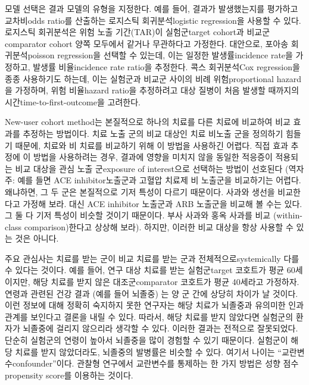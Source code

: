 \documentclass[10.5pt]{book}
\theoremstyle{definition}
\theoremstyle{definition}
\theoremstyle{definition}
\theoremstyle{remark}
\let\BeginKnitrBlock\begin \let\EndKnitrBlock\end
\begin{document}
모델 선택은 결과 모델의 유형을 지정한다. 예를 들어, 결과가 발생했는지를
평가하고 교차비odds ratio를 산출하는 로지스틱 회귀분석logistic
regression을 사용할 수 있다. 로지스틱 회귀분석은 위험 노출 기간(TAR)이
실험군target cohort과 비교군comparator cohort 양쪽 모두에서 같거나
무관하다고 가정한다. 대안으로, 포아송 회귀분석poisson regression을
선택할 수 있는데, 이는 일정한 발생률incidence rate을 가정하고, 발생률
비율incidence rate ratio을 추정한다. 콕스 회귀분석Cox regression을 종종
사용하기도 하는데, 이는 실험군과 비교군 사이의 비례 위험proportional
hazard을 가정하며, 위험 비율hazard ratio을 추정하려고 대상 질병이 처음
발생할 때까지의 시간time-to-first-outcome을 고려한다.
 

\BeginKnitrBlock{rmdimportant}
New-user cohort method는 본질적으로 하나의 치료를 다른 치료에 비교하여
비교 효과를 추정하는 방법이다. 치료 노출 군의 비교 대상인 치료 비노출
군을 정의하기 힘들기 때문에, 치료와 비 치료를 비교하기 위해 이 방법을
사용하긴 어렵다. 직접 효과 추정에 이 방법을 사용하려는 경우, 결과에
영향을 미치지 않을 동일한 적응증이 적용되는 비교 대상을 관심 노출
군exposure of interest으로 선택하는 방법이 선호된다 (역자 주: 예를 들면
ACE inhibitor노출군과 고혈압 치료제 비 노출군을 비교하기는 어렵다.
왜냐하면, 그 두 군은 본질적으로 기저 특성이 다르기 때문이다. 사과와
생선을 비교한다고 가정해 보라. 대신 ACE inhibitor 노출군과 ARB 노출군을
비교해 볼 수는 있다. 그 둘 다 기저 특성이 비슷할 것이기 때문이다. 부사
사과와 홍옥 사과를 비교 (within-class comparison)한다고 상상해 보라).
하지만, 이러한 비교 대상을 항상 사용할 수 있는 것은 아니다.
\EndKnitrBlock{rmdimportant}

주요 관심사는 치료를 받는 군이 비교 치료를 받는 군과
전체적으로systemically 다를 수 있다는 것이다. 예를 들어, 연구 대상
치료를 받는 실험군target 코호트가 평균 60세이지만, 해당 치료를 받지 않은
대조군comparator 코호트가 평균 40세라고 가정하자. 연령과 관련된 건강
결과 (예를 들어 뇌졸중) 는 양 군 간에 상당히 차이가 날 것이다. 이런
정보에 대해 정확히 숙지하지 못한 연구자는 해당 치료가 뇌졸중과 유의미한
인과관계를 보인다고 결론을 내릴 수 있다. 따라서, 해당 치료를 받지
않았다면 실험군의 환자가 뇌졸중에 걸리지 않으리라 생각할 수 있다. 이러한
결과는 전적으로 잘못되었다. 단순히 실험군의 연령이 높아서 뇌졸중을 많이
경험할 수 있기 때문이다. 실험군이 해당 치료를 받지 않았더라도, 뇌졸중의
발병률은 비슷할 수 있다. 여기서 나이는 ``교란변수confounder''이다.
관찰형 연구에서 교란변수를 통제하는 한 가지 방법은 성향 점수propensity
score를 이용하는 것이다. 
\end{document}
